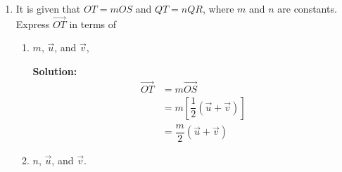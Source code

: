 \documentclass{report}
\newcommand{\sol}{\textbf{Solution:}}
\begin{document}
\begin{enumerate}[leftmargin=*]
\begin{enumerate}
\begin{enumerate}
                              \sol{}
                              \begin{align*}
                                  \overrightarrow{OS} & = \overrightarrow{OQ} + \overrightarrow{QS}                         \\
                                                      & = \vec{v} - \dfrac{1}{2}\overrightarrow{PQ}                         \\
                                                      & = \vec{v} - \dfrac{1}{2}(\overrightarrow{PO} + \overrightarrow{OQ}) \\
                                                      & = \vec{v} - \dfrac{1}{2}(-\vec{u} + \vec{v})                        \\
                                                      & = \dfrac{1}{2}\vec{v} + \dfrac{1}{2}\vec{u}                         \\
                                                      & = \dfrac{1}{2}(\vec{u} + \vec{v})
                              \end{align*}
                    \end{enumerate}

              \item It is given that $OT = mOS$ and $QT = nQR$, where $m$ and $n$ are constants.
                    Express $\overrightarrow{OT}$ in terms of
                    \begin{enumerate}
                        \item $m$, $\vec{u}$, and $\vec{v}$,

                              \sol{}
                              \begin{align*}
                                  \overrightarrow{OT} & = m\overrightarrow{OS}                          \\
                                                      & = m\left[\dfrac{1}{2}(\vec{u} + \vec{v})\right] \\
                                                      & = \dfrac{m}{2}(\vec{u} + \vec{v})
                              \end{align*}

                        \item $n$, $\vec{u}$, and $\vec{v}$.


\end{enumerate}
\end{enumerate}
\end{enumerate}
\end{document}
